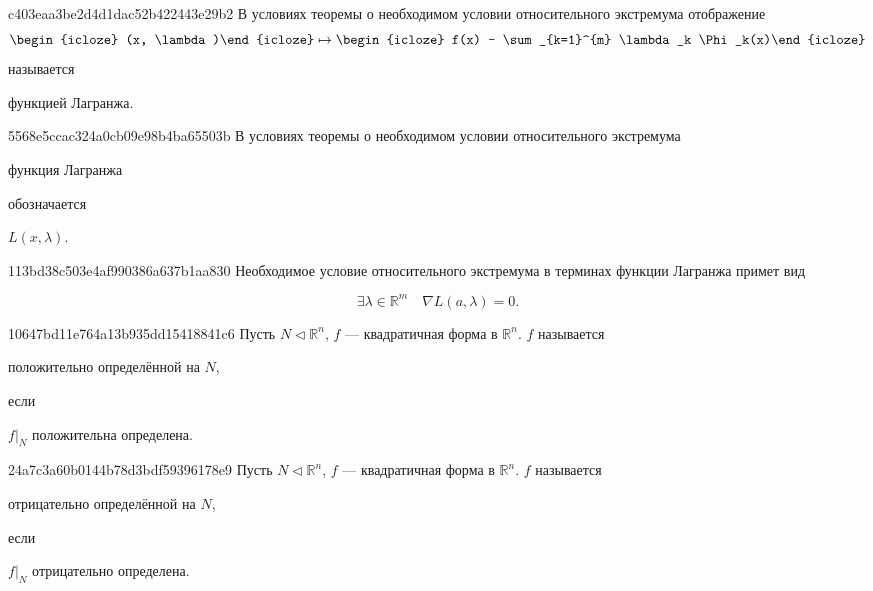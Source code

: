 \begin{note}{c403eaa3be2d4d1dac52b422443e29b2}
    В условиях теоремы о необходимом условии относительного экстремума отображение
    \[
        \begin{icloze}{3}(x, \lambda)\end{icloze} \mapsto \begin{icloze}{2}f(x) - \sum_{k=1}^{m} \lambda_k \Phi_k(x)\end{icloze}
    \]
    называется \begin{icloze}{1}функцией Лагранжа.\end{icloze}
\end{note}

\begin{note}{5568e5ccac324a0cb09e98b4ba65503b}
    В условиях теоремы о необходимом условии относительного экстремума \begin{icloze}{2}функция Лагранжа\end{icloze} обозначается \begin{icloze}{1}\({ L(x, \lambda) }\).\end{icloze}
\end{note}

\begin{note}{113bd38c503e4af990386a637b1aa830}
    Необходимое условие относительного экстремума в терминах функции Лагранжа примет вид
    \begin{icloze}{1}
        \[
            \exists \lambda \in \mathbb R^{m} \quad \nabla L(a, \lambda) = 0.
        \]
    \end{icloze}
\end{note}

\begin{note}{10647bd11e764a13b935dd15418841c6}
    Пусть \({ N \triangleleft \mathbb R^{n} }\), \({ f }\) --- квадратичная форма в \({ \mathbb R^{n} }\).
    \({ f }\) называется \begin{icloze}{2}положительно определённой на \({ N }\),\end{icloze} если \begin{icloze}{1}\({ f|_{N} }\) положительна определена.\end{icloze}
\end{note}

\begin{note}{24a7c3a60b0144b78d3bdf59396178e9}
    Пусть \({ N \triangleleft \mathbb R^{n} }\), \({ f }\) --- квадратичная форма в \({ \mathbb R^{n} }\).
    \({ f }\) называется \begin{icloze}{2}отрицательно определённой на \({ N }\),\end{icloze} если \begin{icloze}{1}\({ f|_{N} }\) отрицательно определена.\end{icloze}
\end{note}

